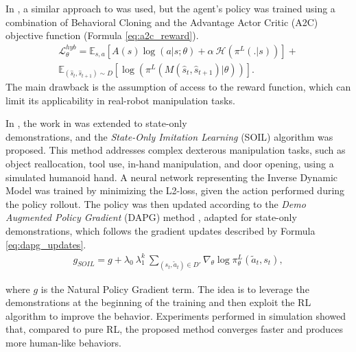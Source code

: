 In \cite{guo2019hybrid_rl}, a similar approach to \cite{torabi2018bco} was used, but the agent's policy was trained using a combination of Behavioral Cloning and the Advantage Actor Critic (A2C) objective function \cite{mnih2016a2c} (Formula \ref{eq:a2c_reward}).
\begin{equation}
    \label{eq:a2c_reward}
    \begin{aligned}
        \mathcal{L}^{hyb}_{\theta} = \mathbb{E}_{s,a} \left[ A(s)\log(a|s;\theta) + \alpha \ \mathcal{H}(\pi^{L}(.|s)) \right] 
        + \\ \mathbb{E}_{(\hat{s}_{t}, \hat{s}_{t+1}) \sim D} \left[ \log(\pi^{L}(M(\hat{s}_{t}, \hat{s}_{t+1})|\theta)) \right].
    \end{aligned}
  \end{equation}
The main drawback is the assumption of access to the reward function, which can limit its applicability in real-robot manipulation tasks.

In \cite{radosavovic2021state_only_demo}, the work in \cite{Rajeswaran18_learning_complex_dexterous} was extended to state-only \\ demonstrations, and the \textit{State-Only Imitation Learning} (SOIL) algorithm was proposed. This method addresses complex dexterous manipulation tasks, such as object reallocation, tool use, in-hand manipulation, and door opening, using a simulated humanoid hand. A neural network representing the Inverse Dynamic Model was trained by minimizing the L2-loss, given the action performed during the policy rollout. The policy was then updated according to the \textit{Demo Augmented Policy Gradient} (DAPG) method \cite{Rajeswaran18_learning_complex_dexterous}, adapted for state-only demonstrations, which follows the gradient updates described by Formula \ref{eq:dapg_updates}.
\begin{equation}
    \label{eq:dapg_updates}
    \begin{aligned}
        g_{SOIL} = g + \lambda_{0} \ \lambda_{1}^{k} \ \sum_{(s_{t}, \tilde{a}_{t}) \in D'} \nabla_{\theta}\log\pi^{L}_{\theta}(\tilde{a}_{t}, s_{t}),
    \end{aligned}
  \end{equation}

where $g$ is the Natural Policy Gradient term. The idea is to leverage the demonstrations at the beginning of the training and then exploit the RL algorithm to improve the behavior. Experiments performed in simulation showed that, compared to pure RL, the proposed method converges faster and produces more human-like behaviors.


